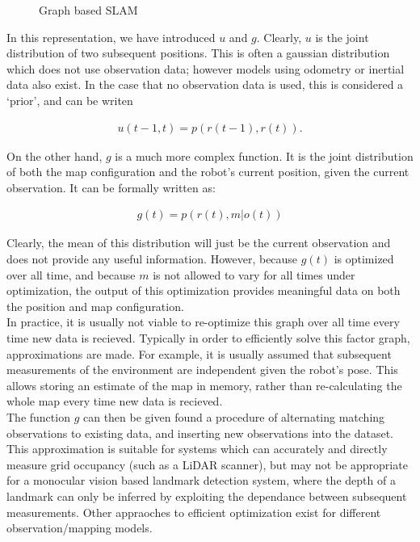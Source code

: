\documentclass[capstone_report.tex]{subfiles}
\begin{document}
\begin{figure}[H]
\centering
  
  \caption{Graph based SLAM\label{fig:graphSlam1}}
\end{figure}

In this representation, we have introduced $u$ and $g$. Clearly, $u$ is the joint distribution of two subsequent positions. This is often a gaussian distribution which does not use observation data; however models using odometry or inertial data also exist. In the case that no observation data is used, this is considered a `prior', and can be writen

\begin{align*}
    u(t-1,t) = p(r(t-1), r(t)). 
\end{align*}

On the other hand, $g$ is a much more complex function. It is the joint distribution of both the map configuration and the robot's current position, given the current observation. It can be formally written as: 

\begin{align*}
  g(t) = p(r(t),m | o(t))
\end{align*}

Clearly, the mean of this distribution will just be the current observation and does not provide any useful information. However, because $g(t)$ is optimized over all time, and because $m$ is not allowed to vary for all times under optimization, the output of this optimization provides meaningful data on both the position and map configuration.\\

In practice, it is usually not viable to re-optimize this graph over all time every time new data is recieved. Typically in order to efficiently solve this factor graph, approximations are made. For example, it is usually assumed that subsequent measurements of the environment are independent given the robot's pose. This allows storing an estimate of the map in memory, rather than re-calculating the whole map every time new data is recieved.\\

The function $g$ can then be given found a procedure of alternating matching observations to existing data, and inserting new observations into the dataset. This approximation is suitable for systems which can accurately and directly measure grid occupancy (such as a LiDAR scanner), but may not be appropriate for a monocular vision based landmark detection system, where the depth of a landmark can only be inferred by exploiting the dependance between subsequent measurements. Other appraoches to efficient optimization exist for different observation/mapping models.\\
\end{document}
